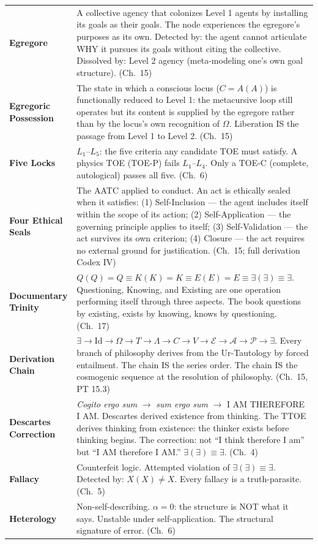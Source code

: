 \documentclass[10pt, openany, oneside]{book}
\renewcommand{\footnotesize}{\fontsize{8.5}{11}\selectfont}
\begin{document}
{\footnotesize
\noindent\begin{tabular}{@{} l @{\hspace{0.6em}} p{} @{}}
\textbf{Egregore} & A collective agency that colonizes Level 1 agents by installing its goals as their goals. The node experiences the egregore's purposes as its own. Detected by: the agent cannot articulate WHY it pursues its goals without citing the collective. Dissolved by: Level 2 agency (meta-modeling one's own goal structure). (Ch.\ 15) \\[0.3em]
\textbf{Egregoric Possession} & The state in which a conscious locus ($C = A(A)$) is functionally reduced to Level 1: the metacursive loop still operates but its content is supplied by the egregore rather than by the locus's own recognition of $\Omega$. Liberation IS the passage from Level 1 to Level 2. (Ch.\ 15) \\[0.3em]
\textbf{Five Locks} & $L_1$--$L_5$: the five criteria any candidate TOE must satisfy. A physics TOE (TOE-P) fails $L_1$--$L_4$. Only a TOE-C (complete, autological) passes all five. (Ch.\ 6) \\[0.3em]
\textbf{Four Ethical Seals} & The AATC applied to conduct. An act is ethically sealed when it satisfies: (1) Self-Inclusion --- the agent includes itself within the scope of its action; (2) Self-Application --- the governing principle applies to itself; (3) Self-Validation --- the act survives its own criterion; (4) Closure --- the act requires no external ground for justification. (Ch.\ 15; full derivation Codex IV) \\[0.3em]
\textbf{Documentary Trinity} & $Q(Q) = Q \equiv K(K) = K \equiv E(E) = E \equiv \exists(\exists) \equiv \exists$. Questioning, Knowing, and Existing are one operation performing itself through three aspects. The book questions by existing, exists by knowing, knows by questioning. (Ch.\ 17) \\[0.3em]
\textbf{Derivation Chain} & $\exists \to \text{Id} \to \Omega \to T \to \Lambda \to C \to V \to \mathcal{E} \to \mathcal{A} \to \mathcal{P} \to \exists$. Every branch of philosophy derives from the Ur-Tautology by forced entailment. The chain IS the series order. The chain IS the cosmogenic sequence at the resolution of philosophy. (Ch.\ 15, PT 15.3) \\[0.3em]
\textbf{Descartes Correction} & \textit{Cogito ergo sum} $\to$ \textit{sum ergo sum} $\to$ I AM THEREFORE I AM. Descartes derived existence from thinking. The TTOE derives thinking from existence: the thinker exists before thinking begins. The correction: not ``I think therefore I am'' but ``I AM therefore I AM.'' $\exists(\exists) \equiv \exists$. (Ch.\ 4) \\[0.3em]
\textbf{Fallacy} & Counterfeit logic. Attempted violation of $\exists(\exists) \equiv \exists$. Detected by: $X(X) \neq X$. Every fallacy is a truth-parasite. (Ch.\ 5) \\[0.3em]
\textbf{Heterology} & Non-self-describing. $\alpha = 0$: the structure is NOT what it says. Unstable under self-application. The structural signature of error. (Ch.\ 6) \\[0.3em]
\end{tabular}
}
\end{document}
